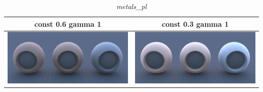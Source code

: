 \documentclass[11pt]{article}
\begin{document}
\begin{table}[ht]
  \centering
  \begin{tabular}{ | c | c | }
    \hline
    const 0.6 gamma 1 & const 0.3 gamma 1 \\ \hline
    \begin{minipage}{.3\textwidth}
      \includegraphics[scale=0.1]{img/obj/metals_el/metals_el_disney_dc03_dg1.jpg}
    \end{minipage}
    &
    \begin{minipage}{.3\textwidth}
      \includegraphics[scale=0.1]{img/obj/metals_el/metals_el_disney_dg1.jpg}
    \end{minipage}
    \\ \hline
  \end{tabular}
  \caption{\textit{metals\_pl}}\label{tbl:myLboro}
\end{table}
\end{document}
